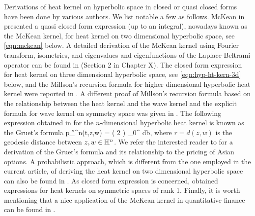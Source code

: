 \documentclass[12pt, reqno]{amsart}
\numberwithin{equation}{section}
\begin{document}
Derivations of heat kernel on hyperbolic space in closed or quasi closed forms have been done by various authors. We list notable a few as follows. McKean in \cite{mckean} presented a quasi closed form expression (up to an integral), nowadays known as the McKean kernel, for heat kernel on two dimensional hyperbolic space, see \eqref{eqn:mckean} below. A detailed derivation of the McKean kernel using Fourier transform, isometries, and eigenvalues and eigenfunctions of the Laplace-Beltrami operator can be found in \cite{chavel} (Section 2 in Chapter X). The closed form expression for heat kernel on three dimensional hyperbolic space, see \eqref{eqn:hyp-ht-kern-3d} below, and the Millson's recursion formula for higher dimensional hyperbolic heat kernel were reported in \cite{debiard-gaveau-mazet}. A different proof of Millson's recursion formula based on the relationship between the heat kernel and the wave kernel and the explicit formula for wave kernel on symmetry space was given in \cite{grigoryan}. The following expression obtained in \cite{gruet} for the $n$-dimensional hyperbolic heat kernel is known as the Gruet's formula 
\beaa
p_{\H^n}(t,z,w) =  \Gamma\left( 2 \right) \int_0^\infty {} db,
\eeaa
where $r = d(z,w)$ is the geodesic distance between $z, w \in \mathbb{H}^n$. We refer the interested reader to \cite{matsumoto-yor} for a derivation of the Gruet's formula and its relationship to the pricing of Asian options. A probabilistic approach, which is different from the one employed in the current article, of deriving the heat kernel on two dimensional hyperbolic space can also be found in \cite{ikeda-matsumoto}. As closed form expression is concerned, \cite{matsumoto} obtained  expressions for heat kernels on symmetric spaces of rank 1. Finally, it is worth  mentioning that a nice application of the McKean kernel in quantitative finance can be found in \cite{hlw}.
\end{document}
